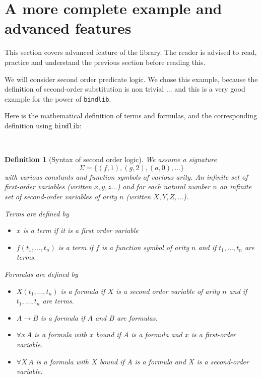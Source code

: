 \documentclass[11pt]{article}
\begin{document}
\section{A more complete example and advanced features}

This section covers advanced feature of the library. The reader is
advised to read, practice and understand the previous section before
reading this.

We will consider second order predicate logic.
We chose this example, because the definition of second-order
substitution is non trivial ... and this is a very good example for
the power of \verb#bindlib#.

Here is the mathematical definition of terms and formulas, and the
corresponding definition using \verb#bindlib#:

\newtheorem{definition}{Definition}\
\begin{definition}[Syntax of second order logic]\rm
We assume a signature
$$\Sigma = \{(f,1), (g,2), (a,0), \dots\}$$ with various
constants and function symbols of
various arity. An infinite set of first-order variables (written
$x,y,z\dots$) and for each natural number $n$ an infinite set of
second-order variables of arity $n$ (written $X,Y,Z,\dots$).

Terms are defined by
\begin{itemize}
\item $x$ is a term if it is a first order variable
\item $f(t_1,\dots,t_n)$ is a term if $f$ is a function symbol of
arity $n$ and if $t_1,\dots,t_n$ are terms.
\end{itemize}

Formulas are defined by
\begin{itemize}
\item $X(t_1,\dots,t_n)$ is a formula if $X$ is a second order variable of
arity $n$ and if $t_1,\dots,t_n$ are terms.
\item $A \to B$ is a formula if $A$ and $B$ are formulas.
\item $\forall x\,A$ is a formula with $x$ bound if $A$ is a formula
and $x$ is a first-order variable.
\item $\forall X\,A$ is a formula with $X$ bound if $A$ is a formula
and $X$ is a second-order variable.
\end{itemize}
\end{definition}
\end{document}
